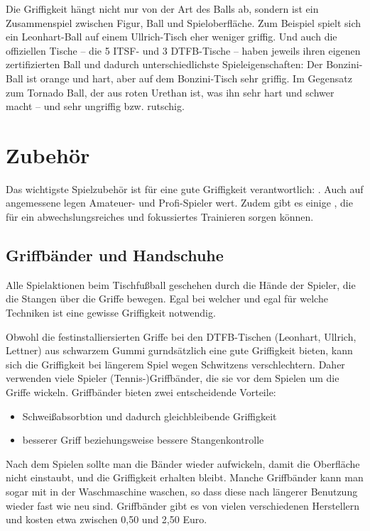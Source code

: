Die Griffigkeit hängt nicht nur von der Art des Balls ab, sondern ist ein Zusammenspiel zwischen Figur, Ball und Spieloberfläche. 
Zum Beispiel spielt sich ein Leonhart-Ball auf einem Ullrich-Tisch eher weniger griffig.  
Und auch die offiziellen Tische -- die 5 ITSF- und 3 DTFB-Tische -- haben jeweils ihren eigenen zertifizierten Ball und dadurch unterschiedlichste Spieleigenschaften:
Der Bonzini-Ball ist orange und hart, aber auf dem Bonzini-Tisch sehr griffig. 
Im Gegensatz zum Tornado Ball, der aus roten Urethan ist, was ihn sehr hart und schwer macht -- und sehr ungriffig bzw. rutschig. 



\section{Zubehör}
\label{tisch:zubehoer}

Das wichtigste Spielzubehör ist für eine gute Griffigkeit verantwortlich: .
Auch auf angemessene  legen Amateuer- und Profi-Spieler wert.
Zudem gibt es einige , die für ein abwechslungsreiches und fokussiertes Trainieren sorgen können.

\subsection{Griffbänder und Handschuhe}
\label{tisch:zubehoer:griffe}

Alle Spielaktionen beim Tischfußball geschehen durch die Hände der Spieler, die die Stangen über die Griffe bewegen.
Egal bei welcher  und egal für welche Techniken ist eine gewisse Griffigkeit notwendig. 

Obwohl die festinstalliersierten Griffe bei den DTFB-Tischen (Leonhart, Ullrich, Lettner) aus schwarzem Gummi gurndsätzlich eine gute Griffigkeit bieten, kann sich die Griffigkeit bei längerem Spiel wegen Schwitzens verschlechtern.
Daher verwenden viele Spieler (Tennis-)Griffbänder, die sie vor dem Spielen um die Griffe wickeln. 
Griffbänder bieten zwei entscheidende Vorteile:
\begin{itemize}
    \item Schweißabsorbtion und dadurch gleichbleibende Griffigkeit
    \item besserer Griff beziehungsweise bessere Stangenkontrolle
\end{itemize}
Nach dem Spielen sollte man die Bänder wieder aufwickeln, damit die Oberfläche nicht einstaubt, und die Griffigkeit erhalten bleibt.
Manche Griffbänder kann man sogar mit in der Waschmaschine waschen, so dass diese nach längerer Benutzung wieder fast  wie neu sind. 
Griffbänder gibt es von vielen verschiedenen Herstellern und kosten etwa zwischen 0,50 und 2,50 Euro. 

